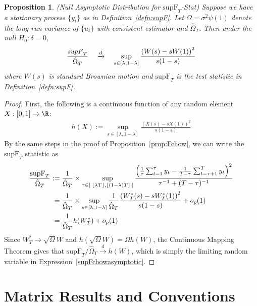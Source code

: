 \documentclass[12pt]{article}
\theoremstyle{plain}
\newtheorem{prop}[thm]{Proposition}
\theoremstyle{definition}
\theoremstyle{remark}
\newcommand{\ra}{\rightarrow}
\newcommand{\dto}{\xrightarrow{d}}
\begin{document}
\begin{prop}\emph{(Null Asymptotic Distribution for $\text{supF}_T$-Stat)}
Suppose we have a stationary process $\{y_t\}$ as in
Definition~\ref{defn:supF}.
Let $\Omega=\sigma^2\psi(1)$ denote the long run variance of
$\{u_t\}$ with consistent estimator and $\hat{\Omega}_T$.
Then under the null $H_0:\delta=0$,
\begin{align}
  \frac{\text{\emph{supF}}_T}{\hat{\Omega}_T}
  \quad\dto\quad
  \sup_{s\in [\lambda,1-\lambda]}
  \frac{%
    \left( W(s) - s W(1)\right)^2
  }{s(1-s)}
  \label{supFchowasymptotic}
\end{align}
where $W(s)$ is standard Brownian motion and $\text{supF}_T$ is the test
statistic in Definition~\ref{defn:supF}.
\end{prop}
\begin{proof}
First, the following is a continuous function of any random element
$X:[0,1]\ra\R$:
\begin{align*}
  h(X)
  :=\sup_{s\in[\lambda,1-\lambda]}
  \frac{( X(s) -sX(1) )^2}{s(1-s)}
\end{align*}
By the same steps in the proof of Proposition~\ref{prop:Fchow}, we can
write the $\text{supF}_T$ statistic as
\begin{align*}
  \frac{\text{{supF}}_T}{\hat{\Omega}_T}
  :=&\;
  \frac{1}{\hat{\Omega}_T}
  \times
  \sup_{%
    \tau \in
    [\;
      \lfloor \lambda T\rfloor,
      \lfloor (1-\lambda) T\rfloor
    \;]
  }
  \frac{%
  \left(
  \frac{1}{\tau}\sum_{t=1}^\tau y_t
  -
  \frac{1}{T-\tau}\sum_{t=\tau+1}^T y_t
  \right)^2
  }{\tau^{-1}+(T-\tau)^{-1}}
  \\
  =&\;
  \frac{1}{\hat{\Omega}_T}
  \times
  \sup_{ s \in [\lambda,1-\lambda]}
  \frac{1}{\hat{\Omega}_T}
  \frac{%
    \left( W_T^*(s) - s W_T^*(1) \right)^2
  }{s(1-s)}
  + o_p(1)
  \\
  =&\;
  \frac{1}{\hat{\Omega}_T}
  h(W_T^*) + o_p(1)
\end{align*}
Since $W_T^*\ra \sqrt{\Omega} W$ and $h(\sqrt{\Omega} W)=\Omega h(W)$,
the Continuous Mapping Theorem gives that
$\text{{supF}}_T/\hat{\Omega}_T \dto h(W)$, which is simply the limiting
random variable in Expression~\ref{supFchowasymptotic}.
\end{proof}






\clearpage
\appendix

\section{Matrix Results and Conventions}
\end{document}
